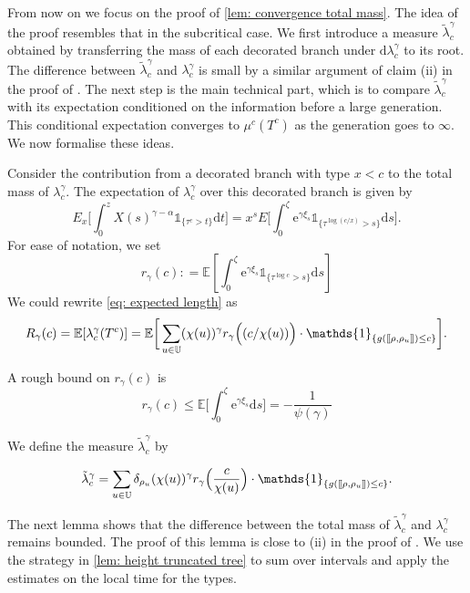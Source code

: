 \documentclass[12pt]{article}
\def\llbracket{[\hspace{-.10em} [ }
\def\rrbracket{ ] \hspace{-.10em}]}
\numberwithin{equation}{section}
\theoremstyle{plain}
\theoremstyle{definition}
\newcommand{\D}{\mathrm{d}}
\begin{document}
From now on we focus on the proof of \cref{lem: convergence total mass}. The idea of the proof resembles that in the subcritical case. We first introduce a measure $\tilde{\lambda}^{\gamma}_c$ obtained by transferring the mass of each decorated branch under $\D\lambda^{\gamma}_c$ to its root. The difference between $\tilde{\lambda}^{\gamma}_c$ and ${\lambda}^{\gamma}_c$ is small by a similar argument of claim (ii) in the proof of \cite[Lemma 2.16]{BertoinJean2024SMta}. The next step is the main technical part, which is to compare $\tilde{\lambda}^{\gamma}_c$ with its expectation conditioned on the information before a large generation. This conditional expectation converges to $\mu^c(T^c)$ as the generation goes to $\infty$. We now formalise these ideas.

Consider the contribution from a decorated branch with type $x<c$ to the total mass of $\lambda^{\gamma}_c$. The expectation of $\lambda^{\gamma}_c$ over this decorated branch is given by
\[E_x\bigg[\int^{z}_{0}X(s)^{\gamma-\alpha}\mathds{1}_{\{\tau^c>t\}}\D t\bigg] = x^sE\bigg[\int^{\zeta}_{0}\mathrm{e}^{\gamma\xi_s}\mathds{1}_{\{\tau^{\log(c/x)}>s\}}\D s\bigg]. \]
For ease of notation, we set
$$
r_{\gamma}(c) : = \mathbb{E}[\int^{\zeta}_{0}\mathrm{e}^{\gamma\xi_s}\mathds{1}_{\{\tau^{\log c}>s\}}\D s]
$$
\noindent We could rewrite \eqref{eq: expected length} as
\begin{equation}\label{eq: expected length 2}
R_{\gamma}(c) = \mathbb{E}[\lambda^{\gamma}_c(T^c)] = \mathbb{E}\bigg[\sum_{u\in\mathbb{U}}(\chi(u))^{\gamma}r_{\gamma}\Big((c/\chi(u))\Big)\cdot\mathds{1}_{\{g(\llbracket \rho, \rho_u \rrbracket)\leq c\}} \bigg].
\end{equation}

\noindent A rough bound on $r_{\gamma}(c)$ is
\begin{equation}\label{eq: rough bound r c}
r_{\gamma}(c)\leq \mathbb{E}\bigg[\int^{\zeta}_0 \mathrm{e}^{\gamma\xi_s}\D s \bigg] = -\frac{1}{\psi(\gamma)}
\end{equation}

We define the measure $\tilde{\lambda}^{\gamma}_c $ by

\begin{equation}\label{eq: def length measure condensed}
\tilde{\lambda}^{\gamma}_c = \sum_{u\in \mathbb{U}} \delta_{\rho_u} (\chi(u))^{\gamma} r_{\gamma}\Big(\frac{c}{\chi(u)}\Big)\cdot \mathds{1}_{\{g(\llbracket \rho,\rho_u \rrbracket)\leq c\}}.
\end{equation}

\noindent The next lemma shows that the difference between the total mass of $\tilde{\lambda}^{\gamma}_c$ and ${\lambda}^{\gamma}_c$ remains bounded. The proof of this lemma is close to (ii) in the proof of \cite[Lemma 2.16]{BertoinJean2024SMta}. We use the strategy in \cref{lem: height truncated tree} to sum over intervals and apply the estimates on the local time for the types.
\end{document}
